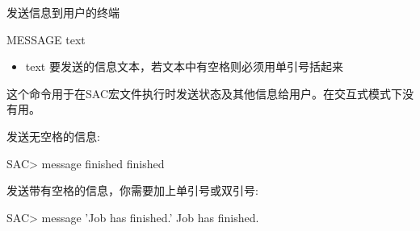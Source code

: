 \label{cmd:message}

发送信息到用户的终端

\begin{SACSTX}
MESSAGE text
\end{SACSTX}

\begin{itemize}
\item text 要发送的信息文本，若文本中有空格则必须用单引号括起来
\end{itemize}

这个命令用于在SAC宏文件执行时发送状态及其他信息给用户。在交互式模式下没有用。

发送无空格的信息:
\begin{SACCode}
SAC> message finished
 finished
\end{SACCode}

发送带有空格的信息，你需要加上单引号或双引号:
\begin{SACCode}
SAC> message 'Job has finished.'
 Job has finished.
\end{SACCode}
